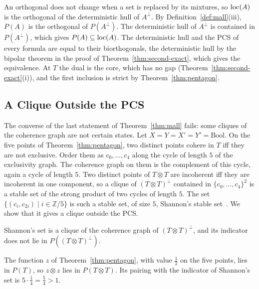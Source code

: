 \noindent
An orthogonal does not change when a set is replaced by its mixtures, so
$\mathrm{loc}(A)$ is the orthogonal of the deterministic hull of $A^{\perp}$. By
Definition~\ref{def:mall}(iii), $P(A)$ is the orthogonal of $P(A^{\perp})$. The deterministic hull of $A^{\perp}$ is contained
in $P(A^{\perp})$, which gives $P(A) \subseteq \mathrm{loc}(A)$. The deterministic hull and
the PCS of every formula are equal to their biorthogonals, the
deterministic hull by the bipolar theorem in the proof of
Theorem~\ref{thm:second-exact}, which gives the equivalence. At $T$ the dual is the core, which has no gap
(Theorem~\ref{thm:second-exact}(i)), and the first inclusion is strict by
Theorem~\ref{thm:pentagon}.

\subsection{A Clique Outside the PCS}
\label{sec:duality-shannon}

The converse of the last statement of Theorem~\ref{thm:mall} fails: some
cliques of the coherence graph are not certain states. Let
$X = Y = X' = Y' = \mathrm{Bool}$. On the five points of
Theorem~\ref{thm:pentagon}, two distinct points cohere in $T$ iff they are
not exclusive. Order them as $c_0, \dots, c_4$ along the cycle of length
$5$ of the exclusivity graph. The coherence graph on them is the
complement of this cycle, again a cycle of length $5$. Two distinct points
of $T \otimes T$ are incoherent iff they are incoherent in one component,
so a clique of $(T \otimes T)^{\perp}$ contained in
$\{c_0, \dots, c_4\}^2$ is a stable set of the strong product of two
cycles of length $5$. The set $\{(c_i, c_{2i}) \mid i \in \mathbb{Z}/5\}$
is such a stable set, of size $5$, Shannon's stable
set~\cite{lovasz1979}. We show that it gives a clique outside the
PCS.

\begin{theorem}
\label{thm:shannon}
Shannon's set is a clique of the coherence graph of $(T \otimes T)^{\perp}$,
and its indicator does not lie in $P((T \otimes T)^{\perp})$.
\end{theorem}

\noindent
The function $z$ of Theorem~\ref{thm:pentagon}, with value $\tfrac12$ on
the five points, lies in $P(T)$, so $z \otimes z$ lies in $P(T \otimes T)$.
Its pairing with the indicator of Shannon's set is
$5 \cdot \tfrac14 = \tfrac54 > 1$.

